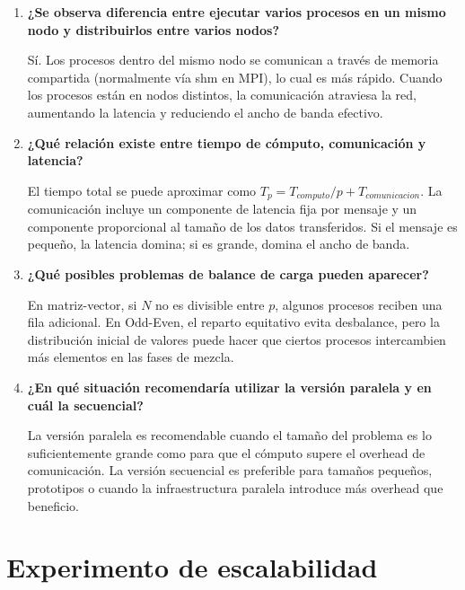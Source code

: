 \documentclass[12pt,a4paper]{article}
\begin{document}
\begin{enumerate}
    Con problemas pequeños el tiempo de comunicación puede ser comparable o mayor que el tiempo de cómputo, produciendo speedups pobres o incluso inferiores a 1. Con problemas grandes la porción de cómputo domina y el speedup mejora, aunque eventualmente también se estabiliza.

    \item \textbf{¿Se observa diferencia entre ejecutar varios procesos en un mismo nodo y distribuirlos entre varios nodos?}
    
    Sí. Los procesos dentro del mismo nodo se comunican a través de memoria compartida (normalmente vía shm en MPI), lo cual es más rápido. Cuando los procesos están en nodos distintos, la comunicación atraviesa la red, aumentando la latencia y reduciendo el ancho de banda efectivo.

    \item \textbf{¿Qué relación existe entre tiempo de cómputo, comunicación y latencia?}
    
    El tiempo total se puede aproximar como $T_p = T_{computo}/p + T_{comunicacion}$. La comunicación incluye un componente de latencia fija por mensaje y un componente proporcional al tamaño de los datos transferidos. Si el mensaje es pequeño, la latencia domina; si es grande, domina el ancho de banda.

    \item \textbf{¿Qué posibles problemas de balance de carga pueden aparecer?}
    
    En matriz-vector, si $N$ no es divisible entre $p$, algunos procesos reciben una fila adicional. En Odd-Even, el reparto equitativo evita desbalance, pero la distribución inicial de valores puede hacer que ciertos procesos intercambien más elementos en las fases de mezcla.

    \item \textbf{¿En qué situación recomendaría utilizar la versión paralela y en cuál la secuencial?}
    
    La versión paralela es recomendable cuando el tamaño del problema es lo suficientemente grande como para que el cómputo supere el overhead de comunicación. La versión secuencial es preferible para tamaños pequeños, prototipos o cuando la infraestructura paralela introduce más overhead que beneficio.
\end{enumerate}

\section{Experimento de escalabilidad}
\label{sec:escalabilidad}
\end{document}
